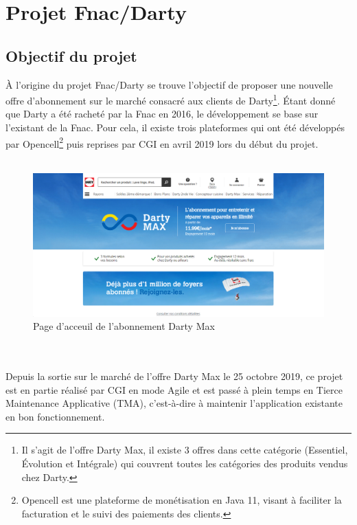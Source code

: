 \documentclass[12pt, a4paper]{report}
\begin{document}
	\chapter{Projet Fnac/Darty}

	\section{Objectif du projet}

	À l'origine du projet Fnac/Darty se trouve l'objectif de proposer une nouvelle offre d'abonnement sur le marché consacré aux clients de Darty\footnote{Il s'agit de l'offre Darty Max, il existe 3 offres dans cette catégorie (Essentiel, Évolution et Intégrale) qui couvrent toutes les catégories des produits vendus chez Darty.}. Étant donné que Darty a été racheté par la Fnac en 2016, le développement se base sur l'existant de la Fnac. Pour cela, il existe trois plateformes qui ont été développés par Opencell\footnote{Opencell est une plateforme de monétisation en Java 11, visant à faciliter la facturation et le suivi des paiements des clients.} puis reprises par CGI en avril 2019 lors du début du projet.
	\\\\
	\begin{figure}[!h]
		\centering
		\includegraphics[width=1\textwidth]{assets/images/page_acceuil_darty_max.png}
		\vspace{-.6cm}
		\caption{Page d'acceuil de l'abonnement Darty Max}
	\end{figure}
	\\\\
	Depuis la sortie sur le marché de l'offre Darty Max le 25 octobre 2019, ce projet est en partie réalisé par CGI en mode Agile et est passé à plein temps en Tierce Maintenance Applicative (TMA), c'est-à-dire à maintenir l'application existante en bon fonctionnement.
\end{document}
